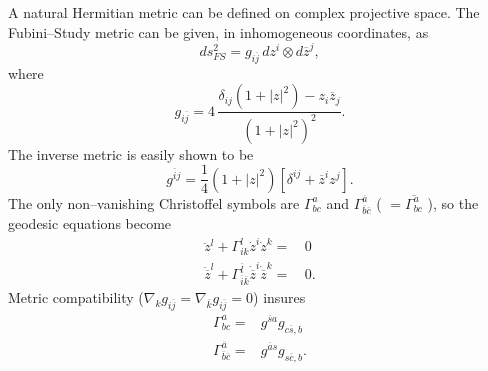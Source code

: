 %
A natural Hermitian metric can be defined on complex projective
space.\cite{Fubini:?,Study:?}
The Fubini--Study metric can be given, in inhomogeneous coordinates, as
\begin{equation}
ds_{FS}^2 = g_{i\overline{j}}\, dz^i\otimes d\overline{z}^j,
\end{equation}
where 
\begin{equation}
g_{i\overline{j}} = 4\,\frac{\delta_{ij}\left( 1 + \left| z \right|^2 \right) - z_i\overline{z}_j }
{ \left( 1 + \left| z\right|^2 \right)^2 }.
\label{e:fsmetric}
\end{equation}
The inverse metric is easily shown to be
\begin{equation}
g^{\overline{i}j} = \frac{1}{4}\left( 
                    1+\left| z\right|^2 
                \right) \left[
                    \delta^{ij} + \overline{z}^iz^j
                \right].
\label{e:fsinvmetric}
\end{equation}
The only non--vanishing Christoffel symbols are $\Gamma^a_{bc}$ and
$\Gamma^{\overline{a}}_{\overline{b}\overline{c}}$ ( $=\overline{\Gamma^a_{bc}}$ ), 
so the geodesic equations become
\begin{equation}
\begin{split}
    \ddot{z}^l + \Gamma^l_{ik}\dot{z}^i\dot{z}^k =&\, 0\\
    \ddot{\overline{z}}^l + \Gamma^{\overline{l}}_{\overline{i}\overline{k}}
            \dot{\overline{z}}^i\dot{\overline{z}}^k =&\, 0.
\end{split}
\label{e:geodesics}
\end{equation}
Metric compatibility ($\nabla_kg_{i\overline{j}} = \nabla_{\overline{k}}
g_{i\overline{j}} = 0$) insures
\begin{equation}
\begin{split}
    \Gamma^a_{bc} =& g^{\overline{s}a} g_{c\overline{s},b}\\
    \Gamma^{\overline{a}}_{\overline{b}\overline{c}} =& g^{\overline{a}s} 
                            g_{s\overline{c},b}.
\end{split}
\label{e:xsymb}
\end{equation}
